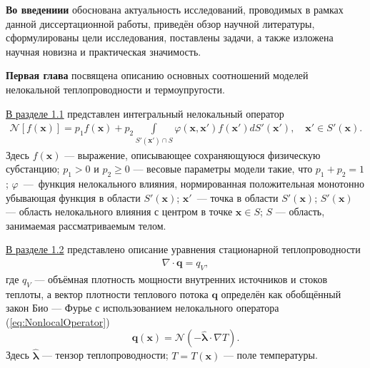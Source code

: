 \textbf{Во введениии} обоснована актуальность исследований, проводимых в рамках данной диссертационной работы, приведён обзор научной литературы, сформулированы цели исследования, поставлены задачи, а также изложена научная новизна и практическая значимость.

\textbf{Первая глава} посвящена описанию основных соотношений моделей нелокальной теплопроводности и термоупругости.

\underline{В разделе 1.1} представлен интегральный нелокальный оператор
\begin{gather}
	\label{eq:NonlocalOperator}
	\mathcal{N} [f(\boldsymbol{x})] = 
	p_1 f(\boldsymbol{x}) + 
	p_2 \int\limits_{S'(\boldsymbol{x}') \cap S} 
		\varphi(\boldsymbol{x}, \boldsymbol{x}') f(\boldsymbol{x}')
	dS'(\boldsymbol{x}'),
	\quad
	\boldsymbol{x}' \in S'(\boldsymbol{x}).
\end{gather}
Здесь $f(\boldsymbol{x})$ --- выражение, описывающее сохраняющуюся физическую субстанцию;
$p_1 > 0$ и $p_2 \geqslant 0$ --- весовые параметры модели такие, что $p_1 + p_2 = 1$;
$\varphi$~---~функция нелокального влияния, нормированная положительная монотонно убывающая функция в области $S'(\boldsymbol{x})$; 
$\boldsymbol{x}'$~--- точка в области $S'(\boldsymbol{x})$;
$S'(\boldsymbol{x})$ --- область нелокального влияния с центром в точке $\boldsymbol{x} \in S$;
$S$ --- область, занимаемая рассматриваемым телом.

\underline{В разделе 1.2} представлено описание уравнения стационарной теплопроводности
\begin{gather}
	\label{eq:StationaryHeatEquation}
	\nabla \cdot \boldsymbol{q} = q_V,
\end{gather}
где $q_V$ --- объёмная плотность мощности внутренних источников и стоков теплоты, а вектор плотности теплового потока $\boldsymbol{q}$ определён как обобщённый закон Био --- Фурье с использованием нелокального оператора (\ref{eq:NonlocalOperator})
\[
	\boldsymbol{q}(\boldsymbol{x}) = 
	\mathcal{N} \left( -\widehat{\boldsymbol{\lambda}} \cdot \nabla T \right).
\]
Здесь $\widehat{\boldsymbol{\lambda}}$ --- тензор теплопроводности;
$T = T (\boldsymbol{x})$ --- поле температуры.

